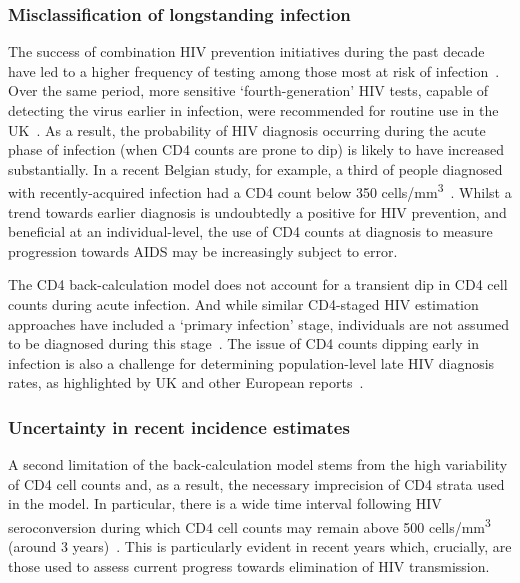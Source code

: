 \subsubsection{Misclassification of longstanding infection}

The success of combination HIV prevention initiatives during the past decade have led to a higher frequency of testing among those most at risk of infection~\parencite{Brown2017-yu}. Over the same period, more sensitive `fourth-generation' HIV tests, capable of detecting the virus earlier in infection, were recommended for routine use in the UK~\parencite{National_Institute_for_Health_and_Care_Excellence2016-us}. As a result, the probability of HIV diagnosis occurring during the acute phase of infection (when CD4 counts are prone to dip) is likely to have increased substantially. In a recent Belgian study, for example, a third of people diagnosed with recently-acquired infection had a CD4 count below 350 cells/mm\textsuperscript{3}~\parencite{Sasse2016-gh}. Whilst a trend towards earlier diagnosis is undoubtedly a positive for HIV prevention, and beneficial at an individual-level, the use of CD4 counts at diagnosis to measure progression towards AIDS may be increasingly subject to error.

The CD4 back-calculation model does not account for a transient dip in CD4 cell counts during acute infection. And while similar CD4-staged HIV estimation approaches have included a `primary infection' stage, individuals are not assumed to be diagnosed during this stage~\parencite{van-Sighem2015-zo}. The issue of CD4 counts dipping early in infection is also a challenge for determining population-level late HIV diagnosis rates, as highlighted by UK and other European reports~\parencite{HIV_Commission2020-yy, Sasse2016-gh, Brannstrom2016-nx}.

\subsubsection{Uncertainty in recent incidence estimates}

A second limitation of the back-calculation model stems from the high variability of CD4 cell counts and, as a result, the necessary imprecision of CD4 strata used in the model. In particular, there is a wide time interval following HIV seroconversion during which CD4 cell counts may remain above 500 cells/mm\textsuperscript{3} (around 3 years)~\parencite{Maartens2014-xd}. This is particularly evident in recent years which, crucially, are those used to assess current progress towards elimination of HIV transmission.


